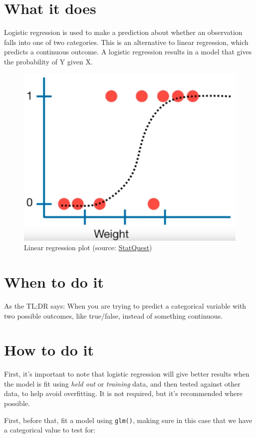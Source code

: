 \documentclass[
]{book}
\begin{document}
\hypertarget{what-it-does-2}{%
\section{What it does}\label{what-it-does-2}}

Logistic regression is used to make a prediction about whether an observation falls into one of two categories. This is an alternative to linear regression, which predicts a continuous outcome. A logistic regression results in a model that gives the probability of Y given X.



\begin{figure}
\includegraphics[width=0.5\linewidth]{images/4_1} \caption{Linear regression plot (source: \href{https://youtu.be/yIYKR4sgzI8?t=222}{StatQuest})}\label{fig:img-lr1}
\end{figure}

\hypertarget{when-to-do-it-2}{%
\section{When to do it}\label{when-to-do-it-2}}

As the TL;DR says: When you are trying to predict a categorical variable with two possible outcomes, like true/false, instead of something continuous.

\hypertarget{how-to-do-it-2}{%
\section{How to do it}\label{how-to-do-it-2}}

First, it's important to note that logistic regression will give better results when the model is fit using \emph{held out} or \emph{training} data, and then tested against other data, to help avoid overfitting. It is not required, but it's recommended where possible.

First, before that, fit a model using \texttt{glm()}, making sure in this case that we have a categorical value to test for:
\end{document}
